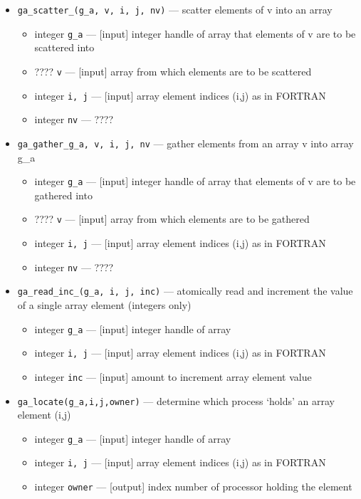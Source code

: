 \begin{itemize}
\item {\tt ga\_scatter\_(g\_a, v, i, j, nv)} --- scatter elements of v into an array
\begin{itemize}
\item     integer {\tt g\_a}         --- [input] integer handle of array that elements of v are to be scattered into
\item     ????    {\tt v}           --- [input] array from which elements are to be scattered
\item     integer {\tt i, j}        --- [input] array element indices (i,j) as in FORTRAN
\item     integer {\tt nv}          ---  ????
\end{itemize}

\item {\tt ga\_gather\_g\_a, v, i, j, nv} --- gather elements from an array v into array g\_a
\begin{itemize}
\item     integer {\tt g\_a}         --- [input] integer handle of array that elements of v are to be gathered into
\item     ????    {\tt v}           --- [input] array from which elements are to be gathered 
\item     integer {\tt i, j}        --- [input] array element indices (i,j) as in FORTRAN
\item     integer {\tt nv}          ---  ????
\end{itemize}

\item {\tt ga\_read\_inc\_(g\_a, i, j, inc)} --- atomically read and increment the value
  of a single array element (integers only)
\begin{itemize}
\item     integer {\tt g\_a}         --- [input] integer handle of array 
\item     integer {\tt i, j}        --- [input] array element indices (i,j) as in FORTRAN
\item     integer {\tt inc}         --- [input] amount to increment array element value
\end{itemize}

\item {\tt ga\_locate(g\_a,i,j,owner)} --- determine which process `holds' an array
  element (i,j)
\begin{itemize}
\item     integer {\tt g\_a}         --- [input] integer handle of array
\item     integer {\tt i, j}        --- [input] array element indices (i,j) as in FORTRAN
\item     integer {\tt owner}       --- [output] index number of processor holding the element
\end{itemize}


\end{itemize}
